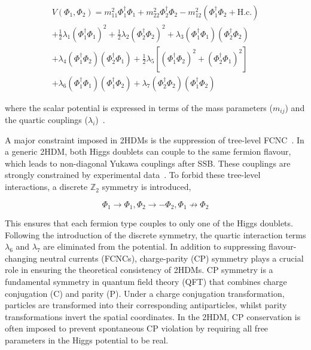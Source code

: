 \begin{equation}
\begin{array}{c}
    V(\Phi_1,\Phi_2) = m_{11}^2 \Phi_1^{\dagger}\Phi_1 + m_{22}^2 \Phi_2^{\dagger}\Phi_2 - m_{12}^2(\Phi_1^\dagger\Phi_2 + \text{H.c.}) \\
    + \frac{1}{2} \lambda_1(\Phi_1^\dagger\Phi_1)^2 + \frac{1}{2}\lambda_2(\Phi_2^\dagger\Phi_2)^2 + \lambda_3(\Phi_1^\dagger\Phi_1)(\Phi_2^\dagger\Phi_2) \\
    + \lambda_4(\Phi_1^\dagger\Phi_2)(\Phi_2^\dagger\Phi_1) + \frac{1}{2}\lambda_5[(\Phi_1^\dagger\Phi_2)^2 + (\Phi_2^\dagger\Phi_1)^2] \\
    + \lambda_6(\Phi_1^\dagger\Phi_1)(\Phi_1^\dagger\Phi_2) + \lambda_7(\Phi_2^\dagger\Phi_2)(\Phi_1^\dagger\Phi_2)
\end{array}
\end{equation}

where the scalar potential is expressed in terms of the mass parameters ($m_{ij}$) and the quartic couplings ($\lambda_i$)~\cite{2HDM_1}. 

A major constraint imposed in 2HDMs is the suppression of tree-level \ac{FCNC}~\cite{FCNC_1,2HDM_2}. In a generic 2HDM, both Higgs doublets can couple to the same fermion flavour, which leads to non-diagonal Yukawa couplings after SSB. These couplings are strongly constrained by experimental data~\cite{FCNC_Constraints}. To forbid these tree-level interactions, a discrete $\mathbb{Z}_2$ symmetry \cite{2HDM_2} is introduced, 

\begin{equation}
    \Phi_1 \to \Phi_1, \Phi_2 \to - \Phi_2, \Phi_1 \not\to \Phi_2 
\end{equation}

This ensures that each fermion type couples to only one of the Higgs doublets. Following the introduction of the discrete symmetry, the quartic interaction terms $\lambda_6$ and $\lambda_7$ are eliminated from the potential. In addition to suppressing flavour-changing neutral currents (FCNCs), charge-parity (CP) symmetry plays a crucial role in ensuring the theoretical consistency of 2HDMs. CP symmetry is a fundamental symmetry in quantum field theory (QFT) that combines charge conjugation (C) and parity (P). Under a charge conjugation transformation, particles are transformed into their corresponding antiparticles, whilst parity transformations invert the spatial coordinates. In the 2HDM, CP conservation is often imposed to prevent spontaneous CP violation by requiring all free parameters in the Higgs potential to be real.

